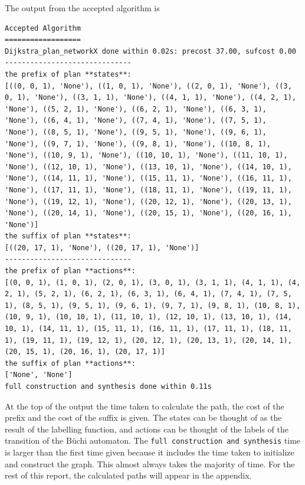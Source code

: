 The output from the accepted algorithm is

\begingroup
\fontsize{9pt}{12pt}\selectfont
\begin{lstlisting}
Accepted Algorithm
==================
Dijkstra_plan_networkX done within 0.02s: precost 37.00, sufcost 0.00
------------------------------
the prefix of plan **states**:
[((0, 0, 1), 'None'), ((1, 0, 1), 'None'), ((2, 0, 1), 'None'), ((3, 0, 1), 'None'), ((3, 1, 1), 'None'), ((4, 1, 1), 'None'), ((4, 2, 1), 'None'), ((5, 2, 1), 'None'), ((6, 2, 1), 'None'), ((6, 3, 1), 'None'), ((6, 4, 1), 'None'), ((7, 4, 1), 'None'), ((7, 5, 1), 'None'), ((8, 5, 1), 'None'), ((9, 5, 1), 'None'), ((9, 6, 1), 'None'), ((9, 7, 1), 'None'), ((9, 8, 1), 'None'), ((10, 8, 1), 'None'), ((10, 9, 1), 'None'), ((10, 10, 1), 'None'), ((11, 10, 1), 'None'), ((12, 10, 1), 'None'), ((13, 10, 1), 'None'), ((14, 10, 1), 'None'), ((14, 11, 1), 'None'), ((15, 11, 1), 'None'), ((16, 11, 1), 'None'), ((17, 11, 1), 'None'), ((18, 11, 1), 'None'), ((19, 11, 1), 'None'), ((19, 12, 1), 'None'), ((20, 12, 1), 'None'), ((20, 13, 1), 'None'), ((20, 14, 1), 'None'), ((20, 15, 1), 'None'), ((20, 16, 1), 'None')]
the suffix of plan **states**:
[((20, 17, 1), 'None'), ((20, 17, 1), 'None')]
------------------------------
the prefix of plan **actions**:
[(0, 0, 1), (1, 0, 1), (2, 0, 1), (3, 0, 1), (3, 1, 1), (4, 1, 1), (4, 2, 1), (5, 2, 1), (6, 2, 1), (6, 3, 1), (6, 4, 1), (7, 4, 1), (7, 5, 1), (8, 5, 1), (9, 5, 1), (9, 6, 1), (9, 7, 1), (9, 8, 1), (10, 8, 1), (10, 9, 1), (10, 10, 1), (11, 10, 1), (12, 10, 1), (13, 10, 1), (14, 10, 1), (14, 11, 1), (15, 11, 1), (16, 11, 1), (17, 11, 1), (18, 11, 1), (19, 11, 1), (19, 12, 1), (20, 12, 1), (20, 13, 1), (20, 14, 1), (20, 15, 1), (20, 16, 1), (20, 17, 1)]
the suffix of plan **actions**:
['None', 'None']
full construction and synthesis done within 0.11s
\end{lstlisting}
\endgroup

At the top of the output the time taken to calculate the path, the cost of the prefix and the cost of the suffix is given. The states can be thought of as the result of the labelling function, and actions can be thought of the labels of the transition of the B\"uchi automaton. The \texttt{full construction and synthesis} time is larger than the first time given because it includes the time taken to initialize and construct the graph. This almost always takes the majority of time. For the rest of this report, the calculated paths will appear in the appendix.%

